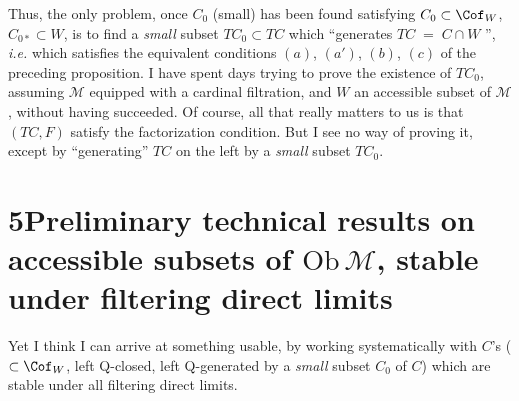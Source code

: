 Thus, the only problem, once $C_0$ (small) has been found satisfying $C_0\subset\Cof_W$, $C_{0*}\subset W$, is to find a \textit{small} subset $TC_0\subset TC$ which ``generates $TC\;=\;C\cap W$ '', \textit{i.e.} which satisfies the equivalent conditions $(a)$, $(a')$, $(b)$, $(c)$ of the preceding proposition. I have spent days trying to prove the existence of $TC_0$, assuming $\mathcal{M}$ equipped with a cardinal filtration, and $W$ an accessible subset of $\mathcal{M}$, without having succeeded. Of course, all that really matters to us is that $(TC,F)$ satisfy the factorization condition. But I see no way of proving it, except by ``generating'' $TC$ on the left by a \textit{small} subset $TC_0$.

\section*{5\quad Preliminary technical results on accessible subsets of $\mathrm{Ob}\,\mathcal{M}$, stable under filtering direct limits}

Yet I think I can arrive at something usable, by working systematically with $C$'s ($\subset\Cof_W$, left Q-closed, left Q-generated by a \textit{small} subset $C_0$ of $C$) which are stable under all filtering direct limits.